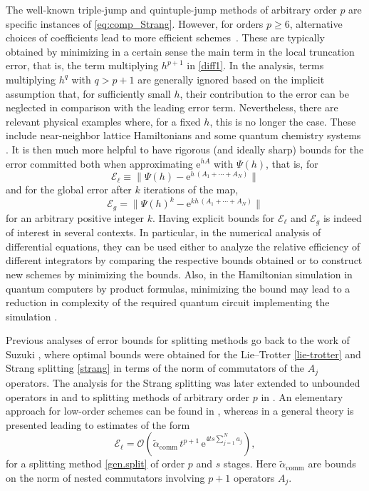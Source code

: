 \documentclass[11pt]{article}
\newcommand{\e}{\ensuremath{\mathrm{e}}}
\begin{document}
The well-known triple-jump \cite{yoshida90coh} and quintuple-jump \cite{suzuki91gto} methods of arbitrary order $p$ are specific instances of  \eqref{eq:comp_Strang}. However, for orders $p \ge 6$, alternative choices of coefficients lead to more efficient schemes~\cite{blanes24smf}. These are typically obtained
by minimizing in a certain sense the main term in the local truncation error, that is, the term multiplying $h^{p+1}$ in \eqref{diff1}. In the analysis, 
terms multiplying $h^q$ with $q > p+1$ are generally ignored based on the implicit assumption that, for sufficiently small $h$,  their contribution to the error can be neglected
in comparison with the leading error term. Nevertheless, there are relevant physical examples where, for a fixed $h$, this is no longer the case. These
include near-neighbor lattice Hamiltonians \cite{childs19nol} and some quantum chemistry systems \cite{wecker14gce}. It is then much more helpful
to have rigorous (and ideally sharp) bounds for the error committed both when approximating $\e^{h A}$ with $\Psi(h)$, that is, for
\[
  \mathcal{E}_{\ell} \equiv \|\Psi(h) - \e^{h\, (A_1+\cdots+A_N)} \|
\]
and for the global error after $k$ iterations of the map, 
\[
  \mathcal{E}_g = \|\Psi(h)^k - \e^{k h \, (A_1+\cdots+A_N)} \|
\]
for an arbitrary positive integer $k$. Having explicit bounds for $\mathcal{E}_{\ell}$ and  $\mathcal{E}_g$ is indeed of interest in several contexts. 
In particular, in the
numerical analysis of differential equations, they can be used either to analyze the relative efficiency of different integrators by comparing
the respective bounds obtained or to construct new schemes by minimizing the bounds. Also,  in the 
Hamiltonian simulation in quantum computers by product formulas, minimizing the bound may lead to a reduction in complexity of the required
quantum circuit implementing the simulation \cite{childs21tot}.

Previous analyses of error bounds for splitting methods go back to the work of Suzuki \cite{suzuki85dfo}, where optimal bounds were obtained for the 
Lie--Trotter \eqref{lie-trotter} and Strang splitting \eqref{strang} in terms of the norm of commutators of the $A_j$ operators. The analysis for the
Strang splitting was later extended  to unbounded operators in \cite{jahnke00ebf} and  to splitting methods
of arbitrary order $p$ in \cite{thalhammer08hoe,descombes10ael}. An elementary approach for low-order schemes can be found in \cite{iserles24aea}, whereas in \cite{childs21tot} a general theory is presented leading to estimates of the form
\[
   \mathcal{E}_{\ell} = \mathcal{O} \left(  \tilde{\alpha}_{\mathrm{comm}} \, t^{p+1} \, \e^{4 t s \sum_{j=1}^N a_j}\right), 
\]
for a splitting method \eqref{gen.split} of order $p$ and $s$ stages. Here
$\tilde{\alpha}_{\mathrm{comm}}$ are bounds on the norm of nested commutators involving $p+1$ operators $A_j$. 
\end{document}
